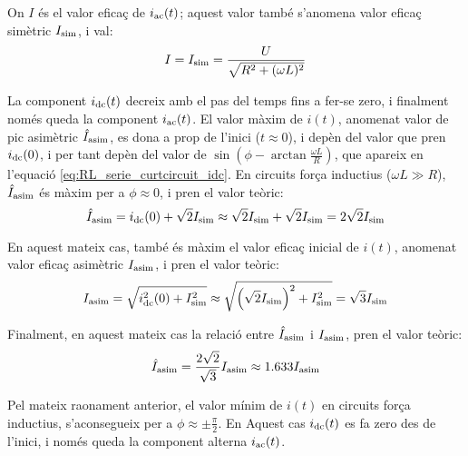 On $I$ és el valor eficaç de $i_\mathrm{ac}(t)$; aquest valor també s'anomena valor eficaç simètric $I_\mathrm{sim}$, i val:
\begin{equation}
    I = I_\mathrm{sim} =\frac{U}{\sqrt{R^2+(\omega L)^2}}
    \label{eq:RL_serie_curtcircuit_I}
\end{equation}

La component $i_\mathrm{dc}(t)$ decreix amb el pas del temps fins a fer-se zero, i finalment només queda la component $i_\mathrm{ac}(t)$. El valor màxim de $i(t)$, anomenat valor de pic asimètric $\hat{I}_\mathrm{asim}$, es dona a prop de l'inici ($t\approx 0$), i depèn del valor que pren $i_\mathrm{dc}(0)$, i per tant depèn del valor de $\sin\left(\phi - \arctan\frac{\omega L}{R}\right)$, que apareix en l'equació \eqref{eq:RL_serie_curtcircuit_idc}. En circuits força inductius ($\omega L\gg R$), $\hat{I}_\mathrm{asim}$ és màxim per a $\phi \approx 0$, i pren el valor teòric:
\begin{equation}
    \hat{I}_\mathrm{asim} = i_\mathrm{dc}(0) + \sqrt{2} I_\mathrm{sim} \approx \sqrt{2} I_\mathrm{sim} +\sqrt{2} I_\mathrm{sim} =2 \sqrt{2} I_\mathrm{sim}    \label{eq:I_asim_pic}
\end{equation}


En aquest mateix cas, també és màxim el valor eficaç inicial de $i(t)$, anomenat valor eficaç asimètric $I_\mathrm{asim}$,  i pren el valor teòric:
\begin{equation}
    I_\mathrm{asim} = \sqrt{i_\mathrm{dc}^2(0) + I_\mathrm{sim}^2} \approx \sqrt{\left(\sqrt{2}I_\mathrm{sim}\right)^2 + I_\mathrm{sim}^2} = \sqrt{3} I_\mathrm{sim} \label{eq:I_asim_eff}
\end{equation}

Finalment, en aquest mateix cas la relació entre $\hat{I}_\mathrm{asim}$ i $I_\mathrm{asim}$,   pren el valor teòric:
\begin{equation}
    \hat{I}_\mathrm{asim} = \frac{2\sqrt{2}}{\sqrt{3}} I_\mathrm{asim} \approx
    \num{1,633} I_\mathrm{asim}
\end{equation}

Pel mateix raonament anterior, el valor mínim de $i(t)$ en circuits força inductius, s'aconsegueix per a $\phi \approx \pm\frac{\pi}{2}$. En Aquest cas $i_\mathrm{dc}(t)$ es fa zero des de l'inici, i només queda la component alterna $i_\mathrm{ac}(t)$.


